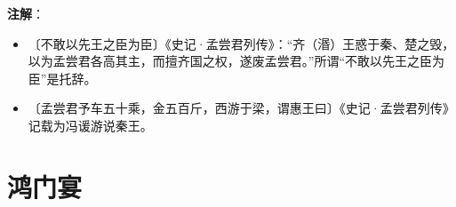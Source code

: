 \documentclass[12pt,UTF-8,openany]{ctexbook}
\begin{document}
\newpage

\textbf{注解}：

\vspace{-1em}

\begin{itemize}
    \setlength\itemsep{-0.2em}
    \item〔不敢以先王之臣为臣〕《史记·孟尝君列传》：“齐（湣）王惑于秦、楚之毁，以为孟尝君各高其主，而擅齐国之权，遂废孟尝君。”所谓“不敢以先王之臣为臣”是托辞。
    \item〔孟尝君予车五十乘，金五百斤，西游于梁，谓惠王曰〕《史记·孟尝君列传》记载为冯谖游说秦王。
\end{itemize}

\chapter{鸿门宴}
\end{document}
